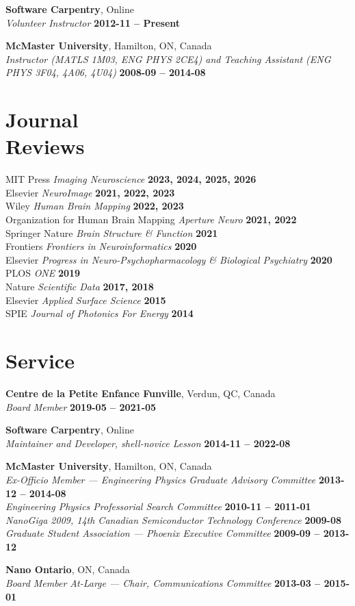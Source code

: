 \documentclass[margin1,line,canadian]{resume}
\begin{document}
\begin{resume}
 \textbf{Software Carpentry}, Online\\%
 \textsl{Volunteer Instructor} \hfill \textbf{2012-11 -- Present}

 \textbf{McMaster University}, Hamilton, ON, Canada \\%
 \textsl{Instructor (MATLS 1M03, ENG PHYS 2CE4) and Teaching Assistant (ENG PHYS 3F04, 4A06, 4U04)} \hfill \textbf{2008-09 -- 2014-08}

 \section{\mysidestyle{}Journal\\Reviews}
 MIT Press \textsl{Imaging Neuroscience} \hfill \textbf{2023, 2024, 2025, 2026}\\
 Elsevier \textsl{NeuroImage} \hfill \textbf{2021, 2022, 2023}\\
 Wiley \textsl{Human Brain Mapping} \hfill \textbf{2022, 2023}\\
 Organization for Human Brain Mapping \textsl{Aperture Neuro} \hfill \textbf{2021, 2022}\\
 Springer Nature \textsl{Brain Structure \& Function} \hfill \textbf{2021}\\
 Frontiers \textsl{Frontiers in Neuroinformatics} \hfill \textbf{2020}\\
 Elsevier \textsl{Progress in Neuro-Psychopharmacology \& Biological Psychiatry} \hfill \textbf{2020}\\
 PLOS \textsl{ONE} \hfill \textbf{2019}\\
 Nature \textsl{Scientific Data} \hfill \textbf{2017, 2018}\\
 Elsevier \textsl{Applied Surface Science} \hfill \textbf{2015}\\
 SPIE \textsl{Journal of Photonics For Energy} \hfill \textbf{2014}

 \section{\mysidestyle{}Service}
 \textbf{Centre de la Petite Enfance Funville}, Verdun, QC, Canada\\%
 \textsl{Board Member} \hfill \textbf{2019-05 -- 2021-05}

 \textbf{Software Carpentry}, Online\\%
 \textsl{Maintainer and Developer, shell-novice Lesson} \hfill \textbf{2014-11 -- 2022-08}

 \textbf{McMaster University}, Hamilton, ON, Canada\\%
 \textsl{Ex-Officio Member --- Engineering Physics Graduate Advisory Committee} \hfill \textbf{2013-12 -- 2014-08}\\
 \textsl{Engineering Physics Professorial Search Committee} \hfill \textbf{2010-11 -- 2011-01}\\
 \textsl{NanoGiga 2009, 14th Canadian Semiconductor Technology Conference} \hfill \textbf{2009-08}\\
 \textsl{Graduate Student Association --- Phoenix Executive Committee} \hfill \textbf{2009-09 -- 2013-12}

 \textbf{Nano Ontario}, ON, Canada\\%
 \textsl{Board Member At-Large --- Chair, Communications Committee} \hfill \textbf{2013-03 -- 2015-01}
\fi

\end{resume}
\end{document}
